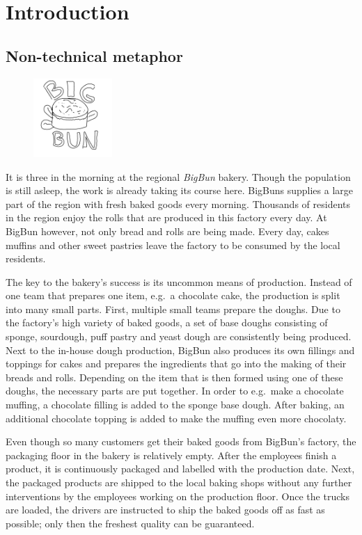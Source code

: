 
\section{Introduction}



\subsection{Non-technical metaphor}%
\begin{figure}
\centering
\includegraphics[width=3cm]{images/figures/big_bun_logo.png}
\end{figure}
It is three in the morning at the regional \textit{BigBun} bakery. Though the
population is still asleep, the work is already taking its course here.
BigBuns supplies a large part of the region with fresh baked goods every
morning. Thousands of residents in the region enjoy the rolls that are
produced in this factory every day. At BigBun however, not only bread and rolls
are being made. Every day, cakes muffins and other sweet pastries leave the
factory to be consumed by the local residents.

The key to the bakery's success is its uncommon means of production. Instead of
one team that prepares one item, e.g.\ a chocolate cake, the production is
split into many small parts. First, multiple small teams prepare the doughs.
Due to the factory's high variety of baked goods, a set of base doughs
consisting of sponge, sourdough, puff pastry and yeast dough are consistently
being produced. Next to the in-house dough production, BigBun also produces its
own fillings and toppings for cakes and prepares the ingredients that go into
the making of their breads and rolls. Depending on the item that is then formed
using one of these doughs, the necessary parts are put together. In order to
e.g.\ make a chocolate muffing, a chocolate filling is added to the sponge base
dough. After baking, an additional chocolate topping is added to make the
muffing even more chocolaty.

Even though so many customers get their baked goods from BigBun's factory, the
packaging floor in the bakery is relatively empty. After the employees finish a
product, it is continuously packaged and labelled with the production date.
Next, the packaged products are shipped to the local baking shops without any
further interventions by the employees working on the production floor. Once
the trucks are loaded, the drivers are instructed to ship the baked goods off
as fast as possible; only then the freshest quality can be guaranteed.


